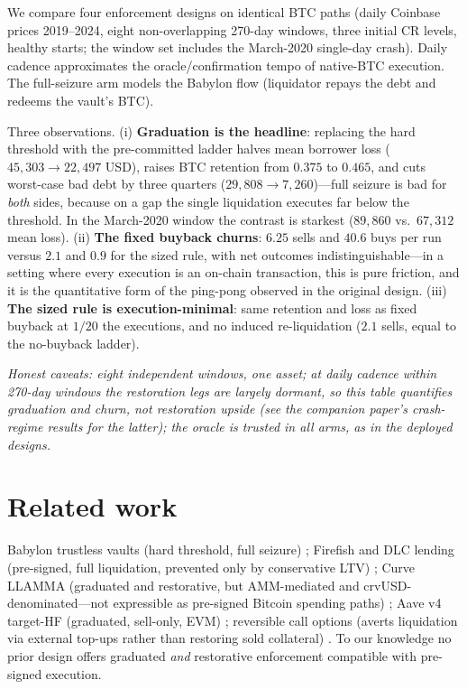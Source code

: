 \documentclass[12pt]{article}
\begin{document}
We compare four enforcement designs on identical BTC paths (daily Coinbase
prices 2019--2024, eight non-overlapping 270-day windows, three initial CR
levels, healthy starts; the window set includes the March-2020 single-day
crash). Daily cadence approximates the oracle/confirmation tempo of native-BTC
execution. The full-seizure arm models the Babylon flow (liquidator repays the
debt and redeems the vault's BTC).


Three observations. (i) \textbf{Graduation is the headline}: replacing the
hard threshold with the pre-committed ladder halves mean borrower loss
($45{,}303 \to 22{,}497$ USD), raises BTC retention from $0.375$ to $0.465$,
and cuts worst-case bad debt by three quarters ($29{,}808 \to 7{,}260$)---full
seizure is bad for \emph{both} sides, because on a gap the single liquidation
executes far below the threshold. In the March-2020 window the contrast is
starkest ($89{,}860$ vs.\ $67{,}312$ mean loss). (ii) \textbf{The fixed
buyback churns}: $6.25$ sells and $40.6$ buys per run versus $2.1$ and $0.9$
for the sized rule, with net outcomes indistinguishable---in a setting where
every execution is an on-chain transaction, this is pure friction, and it is
the quantitative form of the ping-pong observed in the original design.
(iii) \textbf{The sized rule is execution-minimal}: same retention and loss
as fixed buyback at $1/20$ the executions, and no induced re-liquidation
($2.1$ sells, equal to the no-buyback ladder).

\emph{Honest caveats: eight independent windows, one asset; at daily cadence
within 270-day windows the restoration legs are largely dormant, so this
table quantifies graduation and churn, not restoration upside (see the
companion paper's crash-regime results for the latter); the oracle is trusted
in all arms, as in the deployed designs.}

\section{Related work}
Babylon trustless vaults (hard threshold, full seizure)
\cite{babylon-trustless-vaults}; Firefish and DLC lending (pre-signed,
full liquidation, prevented only by conservative LTV)
\cite{firefish-protocol}; Curve LLAMMA (graduated and restorative, but
AMM-mediated and crvUSD-denominated---not expressible as pre-signed Bitcoin
spending paths) \cite{curve-llamma}; Aave v4 target-HF (graduated, sell-only,
EVM) \cite{aave-v4-liquidations}; reversible call options (averts liquidation
via external top-ups rather than restoring sold collateral)
\cite{mahmood2023miqado}. To our knowledge no prior design offers graduated
\emph{and} restorative enforcement compatible with pre-signed execution.
\end{document}
